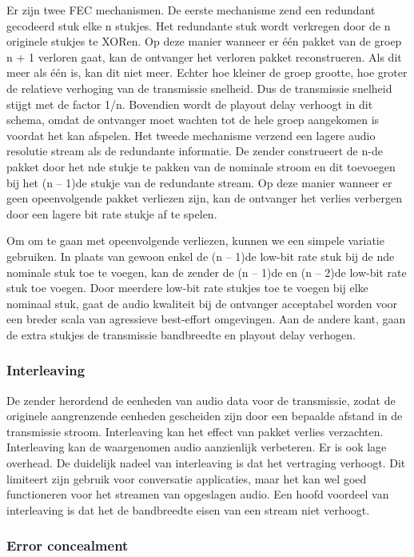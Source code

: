 \noindent Er zijn twee FEC mechanismen. De eerste mechanisme zend een redundant gecodeerd stuk elke n stukjes. Het redundante stuk wordt verkregen door de n originele stukjes te XORen. Op deze manier wanneer er één pakket van de groep n + 1 verloren gaat, kan de ontvanger het verloren pakket reconstrueren. Als dit meer als één is, kan dit niet meer. Echter hoe kleiner de groep grootte, hoe groter de relatieve verhoging van de transmissie snelheid. Dus de transmissie snelheid stijgt met de factor 1/n. Bovendien wordt de playout delay verhoogt in dit schema, omdat de ontvanger moet wachten tot de hele groep aangekomen is voordat het kan afspelen.
Het tweede mechanisme verzend een lagere audio resolutie stream als de redundante informatie. De zender construeert de n-de pakket door het nde stukje te pakken van de nominale stroom en dit toevoegen bij het (n – 1)de stukje van de redundante stream. Op deze manier wanneer er geen opeenvolgende pakket verliezen zijn, kan de ontvanger het verlies verbergen door een lagere bit rate stukje af te spelen.

\noindent Om om te gaan met opeenvolgende verliezen, kunnen we een simpele variatie gebruiken. In plaats van gewoon enkel de (n – 1)de low-bit rate stuk bij de nde nominale stuk toe te voegen, kan de zender de (n – 1)de en (n – 2)de low-bit rate stuk toe voegen. Door meerdere low-bit rate stukjes toe te voegen bij elke nominaal stuk, gaat de audio kwaliteit bij de ontvanger acceptabel worden voor een breder scala van agressieve best-effort omgevingen. Aan de andere kant, gaan de extra stukjes de transmissie bandbreedte en playout delay verhogen.

\subsubsection{Interleaving}

\noindent De zender herordend de eenheden van audio data voor de transmissie, zodat de originele aangrenzende eenheden gescheiden zijn door een bepaalde afstand in de transmissie stroom. Interleaving kan het effect van pakket verlies verzachten. Interleaving kan de waargenomen audio aanzienlijk verbeteren. Er is ook lage overhead. De duidelijk nadeel van interleaving is dat het vertraging verhoogt. Dit limiteert zijn gebruik voor conversatie applicaties, maar het kan wel goed functioneren voor het streamen van opgeslagen audio. Een hoofd voordeel van interleaving is dat het de bandbreedte eisen van een stream niet verhoogt.

\subsubsection{Error concealment}

